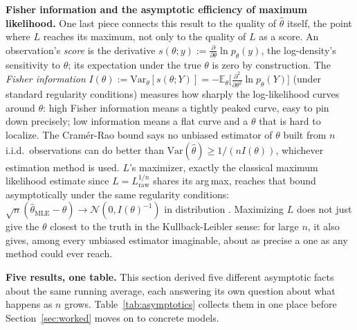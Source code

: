 \documentclass[11pt]{article}
\begin{document}
\textbf{Fisher information and the asymptotic efficiency of maximum
likelihood.} One last piece connects this result to the quality of
$\hat\theta$ itself, the point where $L$ reaches its maximum, not
only to the quality of $L$ as a score. An observation's
\emph{score} is the derivative $s(\theta;y) := \frac{\partial}{\partial
\theta}\ln p_\theta(y)$, the log-density's sensitivity to $\theta$;
its expectation under the true $\theta$ is zero by construction. The
\emph{Fisher information} $I(\theta) := \mathrm{Var}_\theta[s(\theta;Y)]
= -\mathbb E_\theta\big[\frac{\partial^2}{\partial \theta^2}\ln
p_\theta(Y)\big]$ (under standard regularity conditions) measures how
sharply the log-likelihood curves around $\theta$: high Fisher
information means a tightly peaked curve, easy to pin down precisely;
low information means a flat curve and a $\theta$ that is hard to
localize. The Cram\'er-Rao bound says no unbiased estimator of $\theta$
built from $n$ i.i.d.\ observations can do better than
$\mathrm{Var}(\hat\theta) \ge 1/(nI(\theta))$, whichever estimation
method is used. $L$'s maximizer, exactly the classical maximum
likelihood estimate since $L=L_{\text{raw}}^{1/n}$ shares its
arg\,max, reaches that bound asymptotically under the same regularity
conditions: $\sqrt n(\hat\theta_{\text{MLE}} - \theta) \to \mathcal
N(0, I(\theta)^{-1})$ in distribution \citep{bishop2006prml}.
Maximizing $L$ does not just give the $\theta$ closest to the truth in
the Kullback-Leibler sense: for large $n$, it also gives, among every
unbiased estimator imaginable, about as precise a one as any method
could ever reach.

\textbf{Five results, one table.} This section derived five different
asymptotic facts about the same running average, each answering its own
question about what happens as $n$ grows. Table~\ref{tab:asymptotics}
collects them in one place before Section~\ref{sec:worked} moves on to
concrete models.
\end{document}
